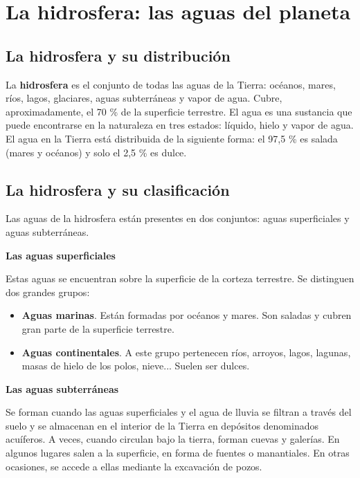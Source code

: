 \section{La hidrosfera: las aguas del planeta}

\subsection{La hidrosfera y su distribución}

La \textbf{hidrosfera} es el conjunto de todas las aguas de la Tierra: océanos, mares, ríos, lagos, glaciares, aguas subterráneas y vapor de agua. Cubre, aproximadamente, el 70 \% de la superficie terrestre. El agua es una sustancia que puede encontrarse en la naturaleza en tres estados: líquido, hielo y vapor de agua. El agua en la Tierra está distribuida de la siguiente forma: el 97,5 \% es salada (mares y océanos) y solo el 2,5 \% es dulce.

\subsection{La hidrosfera y su clasificación}

Las aguas de la hidrosfera están presentes en dos conjuntos: aguas superficiales y aguas subterráneas.

\vspace{3mm}
\textbf{Las aguas superficiales}

\vspace{3mm}
Estas aguas se encuentran sobre la superficie de la corteza terrestre. Se distinguen dos grandes grupos:
\begin{itemize}
    \item \textbf{Aguas marinas}. Están formadas por océanos y mares. Son saladas y cubren gran parte de la superficie terrestre.
    \item \textbf{Aguas continentales}. A este grupo pertenecen ríos, arroyos, lagos, lagunas, masas de hielo de los polos, nieve... Suelen ser dulces.
\end{itemize}

\textbf{Las aguas subterráneas}

\vspace{3mm}
Se forman cuando las aguas superficiales y el agua de lluvia se filtran a través del suelo y se almacenan en el interior de la Tierra en depósitos denominados acuíferos. A veces, cuando circulan bajo la tierra, forman cuevas y galerías. En algunos lugares salen a la superficie, en forma de fuentes o manantiales. En otras ocasiones, se accede a ellas mediante la excavación de pozos.

